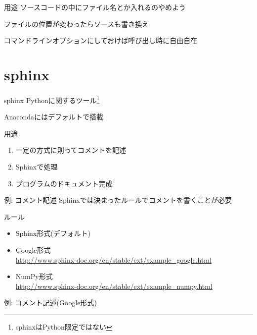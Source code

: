 \documentclass[12pt, xetex, xcolor=pdftex, dvipsnames]{beamer}
\begin{document}
\begin{frame}{用途}
    ソースコードの中にファイル名とか入れるのやめよう

    ファイルの位置が変わったらソースも書き換え

    コマンドラインオプションにしておけば呼び出し時に自由自在
\end{frame}

\section{sphinx}
\begin{frame}{sphinx}
    Pythonに関するツール\footnote{sphinxはPython限定ではない}

    Anacondaにはデフォルトで搭載
\end{frame}
\begin{frame}{用途}
    \begin{enumerate}
        \item 一定の方式に則ってコメントを記述
        \item Sphinxで処理
        \item プログラムのドキュメント完成
    \end{enumerate}
\end{frame}
\begin{frame}{例: コメント記述}
    Sphinxでは決まったルールでコメントを書くことが必要

    \begin{block}{ルール}
        \begin{itemize}
            \item Sphinx形式(デフォルト)
            \item Google形式\\
                \url{http://www.sphinx-doc.org/en/stable/ext/example_google.html}
            \item NumPy形式\\
                \url{http://www.sphinx-doc.org/en/stable/ext/example_numpy.html}
        \end{itemize}
    \end{block}
\end{frame}
\begin{frame}[fragile]{例: コメント記述(Google形式)}
    
\end{frame}
\end{document}
